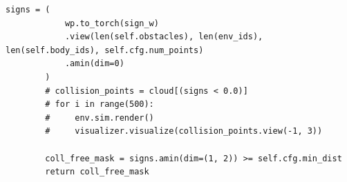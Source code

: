 \begin{snippetbox}[8]
\begin{lstlisting}[firstnumber=190]
        signs = (
            wp.to_torch(sign_w)
            .view(len(self.obstacles), len(env_ids), len(self.body_ids), self.cfg.num_points)
            .amin(dim=0)
        )
        # collision_points = cloud[(signs < 0.0)]
        # for i in range(500):
        #     env.sim.render()
        #     visualizer.visualize(collision_points.view(-1, 3))

        coll_free_mask = signs.amin(dim=(1, 2)) >= self.cfg.min_dist
        return coll_free_mask
\end{lstlisting}
\end{snippetbox}
